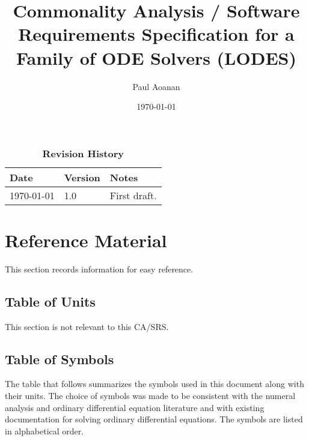 \documentclass[12pt]{article}
\newcommand{\progname}{LODES} %
\newcommand{\progdesc}{Family of ODE Solvers}
\begin{document}
\title{Commonality Analysis / Software Requirements Specification for a \progdesc{} (\progname{})} 
\author{Paul Aoanan}
\date{\today}
	
\maketitle

\tableofcontents

\begin{table}[bp]
\caption{\bf Revision History}
\begin{tabularx}{\textwidth}{p{3cm}p{2cm}X}
\toprule {\bf Date} & {\bf Version} & {\bf Notes}\\
\midrule
\today & 1.0 & First draft.\\
\bottomrule
\end{tabularx}
\end{table}

\section{Reference Material}

This section records information for easy reference.

\subsection{Table of Units}

This section is not relevant to this CA/SRS.

\subsection{Table of Symbols}

The table that follows summarizes the symbols used in this document along with
their units.  The choice of symbols was made to be consistent with the numeral analysis
and ordinary differential equation literature and with existing documentation
for solving ordinary differential equations.  The symbols are listed in alphabetical order.
\end{document}
